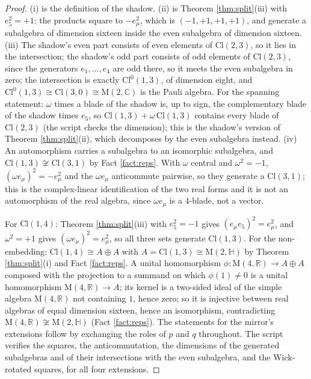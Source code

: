 \documentclass[11pt]{article}
\theoremstyle{definition}
\newcommand{\Cl}{\mathrm{Cl}}
\newcommand{\R}{\mathbb{R}}
\newcommand{\C}{\mathbb{C}}
\newcommand{\HH}{\mathbb{H}}
\newcommand{\Mat}{\mathrm{M}}
\begin{document}
\begin{proof}
(i) is the definition of the shadow. (ii) is Theorem \ref{thm:split}(iii) with $e_{5}^{2} = +1$: the products square to $-e_{\mu}^{2}$, which is $(-1, +1, +1, +1)$, and generate a subalgebra of dimension sixteen inside the even subalgebra of dimension sixteen. (iii) The shadow's even part consists of even elements of $\Cl(2,3)$, so it lies in the intersection; the shadow's odd part consists of odd elements of $\Cl(2,3)$, since the generators $e_{1}, \ldots, e_{4}$ are odd there, so it meets the even subalgebra in zero; the intersection is exactly $\Cl^{0}(1,3)$, of dimension eight, and $\Cl^{0}(1,3) \cong \Cl(3,0) \cong \Mat(2,\C)$ is the Pauli algebra. For the spanning statement: $\omega$ times a blade of the shadow is, up to sign, the complementary blade of the shadow times $e_{5}$, so $\Cl(1,3) + \omega\,\Cl(1,3)$ contains every blade of $\Cl(2,3)$ (the script checks the dimension); this is the shadow's version of Theorem \ref{thm:split}(ii), which decomposes by the even subalgebra instead. (iv) An automorphism carries a subalgebra to an isomorphic subalgebra, and $\Cl(1,3) \not\cong \Cl(3,1)$ by Fact \ref{fact:reps}. With $\omega$ central and $\omega^{2} = -1$, $(\omega e_{\mu})^{2} = -e_{\mu}^{2}$ and the $\omega e_{\mu}$ anticommute pairwise, so they generate a $\Cl(3,1)$; this is the complex-linear identification of the two real forms and it is not an automorphism of the real algebra, since $\omega e_{\mu}$ is a $4$-blade, not a vector.

For $\Cl(1,4)$: Theorem \ref{thm:split}(iii) with $e_{5}^{2} = -1$ gives $(e_{\mu}e_{5})^{2} = e_{\mu}^{2}$, and $\omega^{2} = +1$ gives $(\omega e_{\mu})^{2} = e_{\mu}^{2}$, so all three sets generate $\Cl(1,3)$. For the non-embedding: $\Cl(1,4) \cong A \oplus A$ with $A = \Cl(1,3) \cong \Mat(2,\HH)$ by Theorem \ref{thm:split}(i) and Fact \ref{fact:reps}. A unital homomorphism $\phi: \Mat(4,\R) \to A \oplus A$ composed with the projection to a summand on which $\phi(1) \neq 0$ is a unital homomorphism $\Mat(4,\R) \to A$; its kernel is a two-sided ideal of the simple algebra $\Mat(4,\R)$ not containing $1$, hence zero; so it is injective between real algebras of equal dimension sixteen, hence an isomorphism, contradicting $\Mat(4,\R) \not\cong \Mat(2,\HH)$ (Fact \ref{fact:reps}). The statements for the mirror's extensions follow by exchanging the roles of $p$ and $q$ throughout. The script verifies the squares, the anticommutation, the dimensions of the generated subalgebras and of their intersections with the even subalgebra, and the Wick-rotated squares, for all four extensions.
\end{proof}
\end{document}
